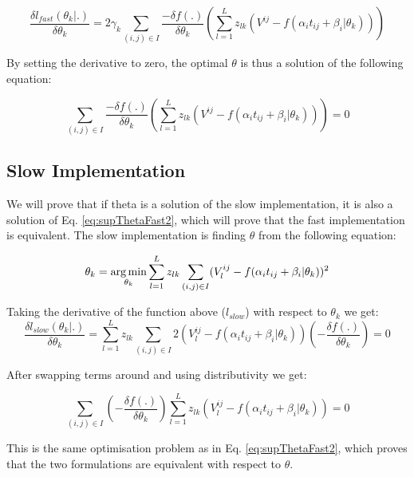 \begin{equation}
\frac{\delta l_{fast}(\theta_k|.)}{\delta \theta_k} = 2 \gamma_k \sum_{(i,j) \in I} \frac{-\delta f(.)}{\delta \theta_k} \left( \sum_{l=1}^L z_{lk} \left( V^{ij} - f(\alpha_i t_{ij} + \beta_i | \theta_k) \right) \right)
\end{equation}

By setting the derivative to zero, the optimal $\theta$ is thus a solution of the following equation:

\begin{equation}
\label{eq:supThetaFast2}
\sum_{(i,j) \in I} \frac{-\delta f(.)}{\delta \theta_k} \left( \sum_{l=1}^L z_{lk} \left( V^{ij} - f(\alpha_i t_{ij} + \beta_i | \theta_k) \right) \right) = 0
\end{equation}


\subsection{Slow Implementation}

We will prove that if theta is a solution of the slow implementation, it is also a solution of Eq. \ref{eq:supThetaFast2}, which will prove that the fast implementation is equivalent. The slow implementation is finding $\theta$ from the following equation:

\begin{equation}
 \theta_k = \operatorname*{arg\,min}_{\theta_k} \sum_{l=1}^L z_{lk} \sum_{(i,j) \in I} (V_l^{ij} - f(\alpha_i t_{ij} + \beta_i | \theta_k))^2
\end{equation}

Taking the derivative of the function above ($l_{slow}$) with respect to $\theta_k$ we get:
\begin{equation}
\frac{\delta l_{slow}(\theta_k|.)}{\delta \theta_k} = \sum_{l=1}^L z_{lk} \sum_{(i,j) \in I} 2 (V_l^{ij} - f(\alpha_i t_{ij} + \beta_i | \theta_k)) \left(-\frac{\delta f(.)}{\delta \theta_k} \right) = 0
\end{equation}

After swapping terms around and using distributivity we get:

\begin{equation}
  \sum_{(i,j) \in I} \left(-\frac{\delta f(.)}{\delta \theta_k} \right) \sum_{l=1}^L z_{lk} (V_l^{ij} - f(\alpha_i t_{ij} + \beta_i | \theta_k))  = 0
\end{equation}

This is the same optimisation problem as in Eq. \ref{eq:supThetaFast2}, which proves that the two formulations are equivalent with respect to $\theta$.

